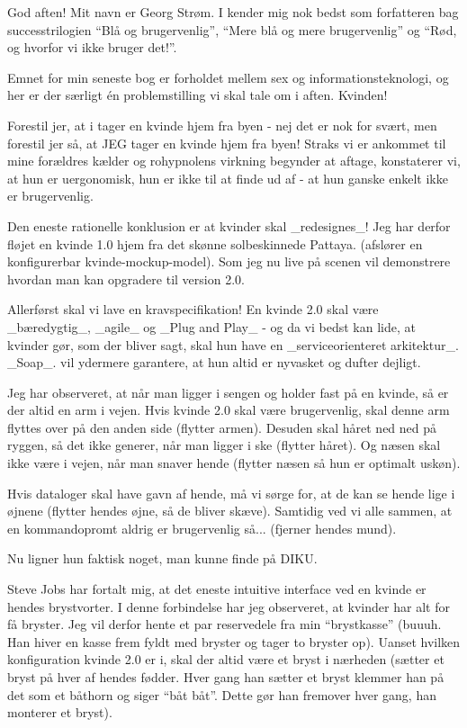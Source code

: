 \documentclass[a4paper,11pt]{article}
\begin{document}
  
\begin{sketch}

 God aften! Mit navn er Georg Strøm. I kender mig nok bedst som forfatteren bag successtrilogien ``Blå og brugervenlig'', ``Mere blå og mere brugervenlig'' og ``Rød, og hvorfor vi ikke bruger det!''.

Emnet for min seneste bog er forholdet mellem sex og informationsteknologi, og her er der særligt én problemstilling vi skal tale om i aften. Kvinden!

Forestil jer, at i tager en kvinde hjem fra byen - nej det er nok for svært, men forestil jer så, at JEG tager en kvinde hjem fra byen! Straks vi er ankommet til mine forældres kælder og rohypnolens virkning begynder at aftage, konstaterer vi, at hun er uergonomisk, hun er ikke til at finde ud af - at hun ganske enkelt ikke er brugervenlig.

Den eneste rationelle konklusion er at kvinder skal \_redesignes\_! Jeg har derfor fløjet en kvinde 1.0 hjem fra det skønne solbeskinnede Pattaya. (afslører en konfigurerbar kvinde-mockup-model). Som jeg nu live på scenen vil demonstrere hvordan man kan opgradere til version 2.0.

Allerførst skal vi lave en kravspecifikation! En kvinde 2.0 skal være \_bæredygtig\_, \_agile\_ og \_Plug and Play\_ - og da vi bedst kan lide, at kvinder gør, som der bliver sagt, skal hun have en \_serviceorienteret arkitektur\_. \_Soap\_. vil ydermere garantere, at hun altid er nyvasket og dufter dejligt.

Jeg har observeret, at når man ligger i sengen og holder fast på en kvinde, så er der altid en arm i vejen. Hvis kvinde 2.0 skal være brugervenlig, skal denne arm flyttes over på den anden side (flytter armen). Desuden skal håret ned ned på ryggen, så det ikke generer, når man ligger i ske (flytter håret). Og næsen skal ikke være i vejen, når man snaver hende (flytter næsen så hun er optimalt uskøn).

Hvis dataloger skal have gavn af hende, må vi sørge for, at de kan se hende lige i øjnene (flytter hendes øjne, så de bliver skæve). Samtidig ved vi alle sammen, at en kommandopromt aldrig er brugervenlig så... (fjerner hendes mund).

Nu ligner hun faktisk noget, man kunne finde på DIKU.

Steve Jobs har fortalt mig, at det eneste intuitive interface ved en kvinde er hendes brystvorter. I denne forbindelse har jeg observeret, at kvinder har alt for få bryster. Jeg vil derfor hente et par reservedele fra min ``brystkasse'' (buuuh. Han hiver en kasse frem fyldt med bryster og tager to bryster op).
Uanset hvilken konfiguration kvinde 2.0 er i, skal der altid være et bryst i nærheden (sætter et bryst på hver af hendes fødder. Hver gang han sætter et bryst klemmer han på det som et båthorn og siger ``båt båt''. Dette gør han fremover hver gang, han monterer et bryst). 


\end{sketch}
\end{document}
